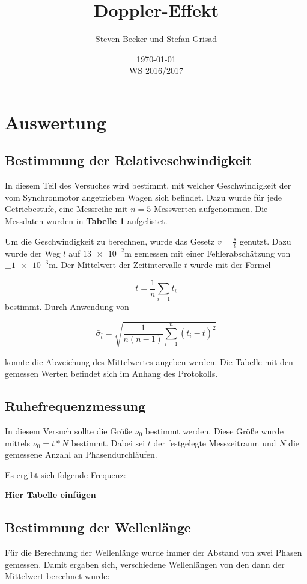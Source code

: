 \documentclass[parskip=half]{scrartcl} %
\author{Steven Becker und Stefan Grisad}
\title{Doppler-Effekt}
\date{\today\\WS 2016/2017}
\begin{document}
\maketitle
%
\section{Auswertung}
\subsection{Bestimmung der Relativeschwindigkeit}

In diesem Teil des Versuches wird bestimmt, mit welcher Geschwindigkeit der vom Synchronmotor angetrieben Wagen sich befindet.
Dazu wurde für jede Getriebestufe, eine Messreihe mit $n=5$ Messwerten aufgenommen.
Die Messdaten wurden in \textbf{Tabelle 1} aufgelistet.

Um die Geschwindigkeit zu berechnen, wurde das Gesetz $v=\frac{s}{t}$
genutzt. Dazu wurde der Weg $l$ auf $\num{13e-2}\si{\meter}$ gemessen mit einer Fehlerabschätzung von $\pm\num{1e-3}\si{\meter}$. 
Der Mittelwert der Zeitintervalle $t$ wurde mit der Formel

\begin{equation*}
\bar{t}=\frac{1}{n}\sum_{i=1}t_i
\end{equation*}
bestimmt. Durch Anwendung von 

\begin{equation*}
\bar{\sigma}_{\bar{t}}=\sqrt{\frac{1}{n(n-1)}\sum_{i=1}^{n}(t_i-\bar{t})^2}
\end{equation*}

konnte die Abweichung des Mittelwertes angeben werden.
Die Tabelle mit den gemessen Werten befindet sich im Anhang des Protokolls.

\subsection{Ruhefrequenzmessung}

In diesem Versuch sollte die Größe $\nu_0$ bestimmt werden. 
Diese Größe wurde mittels $\nu_0=t*N$ bestimmt. Dabei sei $t$ der 
festgelegte Messzeitraum und $N$ die gemessene Anzahl an Phasendurchläufen. 

Es ergibt sich folgende Frequenz:

\textbf{Hier Tabelle einfügen}

\subsection{Bestimmung der Wellenlänge} 
Für die Berechnung der Wellenlänge wurde immer der Abstand von 
zwei Phasen gemessen. 
Damit ergaben sich, verschiedene Wellenlängen von den dann 
der Mittelwert berechnet wurde:
\end{document}
